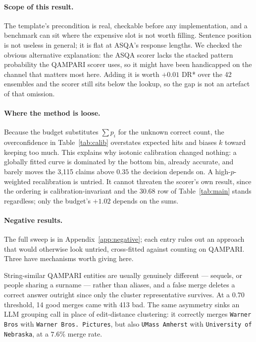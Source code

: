 \documentclass{article}
\begin{document}
\paragraph{Scope of this result.}
The template's precondition is real, checkable before any implementation, and a benchmark can sit where the expensive slot is not worth filling. Sentence position is not useless in general; it is flat at ASQA's response lengths. We checked the obvious alternative explanation: the ASQA scorer lacks the stacked pattern probability the QAMPARI scorer uses, so it might have been handicapped on the channel that matters most here. Adding it is worth $+0.01$ DR* over the 42 ensembles and the scorer still sits below the lookup, so the gap is not an artefact of that omission.

\paragraph{Where the method is loose.}
\label{sec:calib}



Because the budget substitutes $\sum p_i$ for the unknown correct count, the overconfidence in Table~\ref{tab:calib} overstates expected hits and biases $k$ toward keeping too much. This explains why isotonic calibration changed nothing: a globally fitted curve is dominated by the bottom bin, already accurate, and barely moves the 3,115 claims above $0.35$ the decision depends on. A high-$p$-weighted recalibration is untried. It cannot threaten the scorer's own result, since the ordering is calibration-invariant and the $30.68$ row of Table~\ref{tab:main} stands regardless; only the budget's $+1.02$ depends on the sums.

\paragraph{Negative results.}
\label{sec:negative}

The full sweep is in Appendix~\ref{app:negative}; each entry rules out an approach that would otherwise look untried, cross-fitted against counting on QAMPARI. Three have mechanisms worth giving here.



String-similar QAMPARI entities are usually genuinely different --- sequels, or people sharing a surname --- rather than aliases, and a false merge deletes a correct answer outright since only the cluster representative survives. At a $0.70$ threshold, 14 good merges came with 413 bad. %
The same asymmetry sinks an LLM grouping call in place of edit-distance clustering: it correctly merges \texttt{Warner Bros} with \texttt{Warner Bros. Pictures}, but also \texttt{UMass Amherst} with \texttt{University of Nebraska}, at a $7.6\%$ merge rate.
\end{document}
